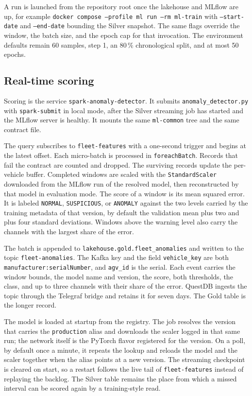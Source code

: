 A run is launched from the repository root once the lakehouse and MLflow are up, for example \texttt{docker compose --profile ml run --rm ml-train} with \texttt{--start-date} and \texttt{--end-date} bounding the Silver snapshot. The same flags override the window, the batch size, and the epoch cap for that invocation. The environment defaults remain 60 samples, step 1, an 80\,\% chronological split, and at most 50 epochs.

\subsection{Real-time scoring}
\label{subsec:ml-inference-implementation}

Scoring is the service \texttt{spark-anomaly-detector}. It submits \texttt{anomaly\_detector.py} with \texttt{spark-submit} in local mode, after the Silver streaming job has started and the MLflow server is healthy. It mounts the same \texttt{ml-common} tree and the same contract file.

The query subscribes to \texttt{fleet-features} with a one-second trigger and begins at the latest offset. Each micro-batch is processed in \texttt{foreachBatch}. Records that fail the contract are counted and dropped. The surviving records update the per-vehicle buffer. Completed windows are scaled with the \texttt{StandardScaler} downloaded from the MLflow run of the resolved model, then reconstructed by that model in evaluation mode. The score of a window is its mean squared error. It is labeled \texttt{NORMAL}, \texttt{SUSPICIOUS}, or \texttt{ANOMALY} against the two levels carried by the training metadata of that version, by default the validation mean plus two and plus four standard deviations. Windows above the warning level also carry the channels with the largest share of the error.

The batch is appended to \texttt{lakehouse.gold.fleet\_anomalies} and written to the topic \texttt{fleet-anomalies}. The Kafka key and the field \texttt{vehicle\_key} are both \texttt{manufacturer:serialNumber}, and \texttt{agv\_id} is the serial. Each event carries the window bounds, the model name and version, the score, both thresholds, the class, and up to three channels with their share of the error. QuestDB ingests the topic through the Telegraf bridge and retains it for seven days. The Gold table is the longer record.

The model is loaded at startup from the registry. The job resolves the version that carries the \texttt{production} alias and downloads the scaler logged in that same run; the network itself is the PyTorch flavor registered for the version. On a poll, by default once a minute, it repeats the lookup and reloads the model and the scaler together when the alias points at a new version. The streaming checkpoint is cleared on start, so a restart follows the live tail of \texttt{fleet-features} instead of replaying the backlog. The Silver table remains the place from which a missed interval can be scored again by a training-style read.

